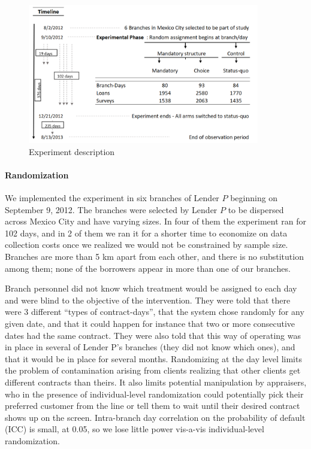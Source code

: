 \documentclass[12pt, a4paper, colorinlistoftodos]{article}
\begin{document}
\begin{figure}[htbp]    
 \caption{Experiment description}
\begin{center}
\includegraphics[width=0.9\textwidth]{Figuras/consort.png}
  \end{center}
     \label{exp_description}
\end{figure}


\paragraph*{Randomization} We implemented the experiment in six branches of Lender $P$ beginning on September 9, 2012. The branches were selected by Lender $P$ to be dispersed across Mexico City and have varying sizes. In four of them the experiment ran for 102 days, and in 2 of them we ran it for a shorter time to economize on data collection costs once we realized we would not be constrained by sample size. %
Branches are more than 5 km apart from each other, and there is no substitution among them; none of the borrowers appear in more than one of our branches.

Branch personnel did not know which treatment would be assigned to each day and were blind to the objective of the intervention. They were told that there were 3 different ``types of contract-days'', that the system chose randomly for any given date, and that it could happen for instance that two or more consecutive dates had the same contract. They were also told that this way of operating was in place in several of Lender P's branches (they did not know which ones), and that it would be in place for several months. Randomizing at the day level limits the problem of contamination arising from clients realizing that other clients get different contracts than theirs. It also limits potential manipulation by appraisers, who in the presence of individual-level randomization could potentially pick their preferred customer from the line or tell them to wait until their desired contract shows up on the screen. Intra-branch day correlation on the probability of default (ICC) is small, at {0.05}, so we lose little power vis-a-vis individual-level randomization.
\end{document}
